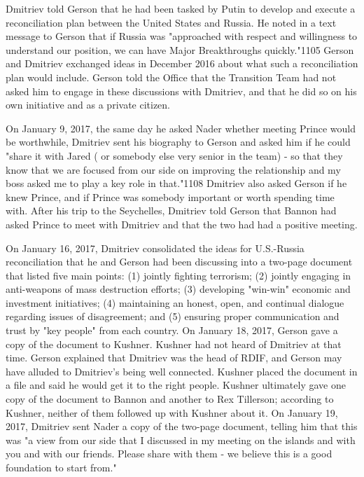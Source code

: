 Dmitriev told Gerson that he had been tasked by Putin to develop and execute a reconciliation plan between the United States and Russia. He noted in a text message to Gerson that if Russia was "approached with respect and willingness to understand our position, we can have Major Breakthroughs quickly."1105 Gerson and Dmitriev exchanged ideas in December 2016 about what such a reconciliation plan would include.%
Gerson told the Office that the Transition Team had not asked him to engage in these discussions with Dmitriev, and that he did so on his own initiative and as a private citizen.%

On January 9, 2017, the same day he asked Nader whether meeting Prince would be worthwhile, Dmitriev sent his biography to Gerson and asked him if he could "share it with Jared ( or somebody else very senior in the team) - so that they know that we are focused from our side on improving the relationship and my boss asked me to play a key role in that."1108 Dmitriev also asked Gerson if he knew Prince, and if Prince was somebody important or worth spending time with.%
After his trip to the Seychelles, Dmitriev told Gerson that Bannon had asked Prince to meet with Dmitriev and that the two had had a positive meeting.%

On January 16, 2017, Dmitriev consolidated the ideas for U.S.-Russia reconciliation that he and Gerson had been discussing into a two-page document that listed five main points: (1) jointly fighting terrorism; (2) jointly engaging in anti-weapons of mass destruction efforts; (3) developing "win-win" economic and investment initiatives; (4) maintaining an honest, open, and continual dialogue regarding issues of disagreement; and (5) ensuring proper communication and trust by "key people" from each country.%
On January 18, 2017, Gerson gave a copy of the document to Kushner.%
Kushner had not heard of Dmitriev at that time.%
Gerson explained that Dmitriev was the head of RDIF, and Gerson may have alluded to Dmitriev's being well connected.%
Kushner placed the document in a file and said he would get it to the right people.%
Kushner ultimately gave one copy of the document to Bannon and another to Rex Tillerson; according to Kushner, neither of them followed up with Kushner about it.%
On January 19, 2017, Dmitriev sent Nader a copy of the two-page document, telling him that this was "a view from our side that I discussed in my meeting on the islands and with you and with our friends. Please share with them - we believe this is a good foundation to start from."%

